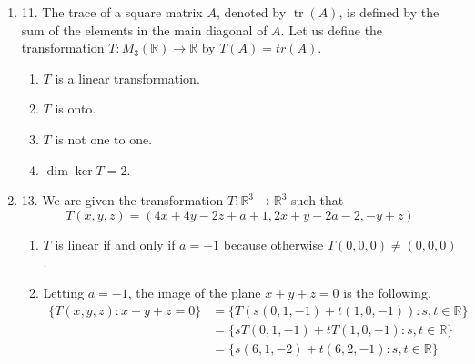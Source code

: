 \documentclass{article}
\newenvironment{answers}{ %
	\begin{enumerate}
		\setlength{\itemsep}{\bigskipamount}
}{\end{enumerate}}
\newcommand{\R}{\mathbb{R}}
\newcommand{\tr}{\operatorname{tr}}
\begin{document}
\begin{answers}
\begin{enumerate}
				For \(T\) to meet these constraints, the following must hold true.
				\begin{equation*}
					\forall s,t \in \R,\ T((2,2,1) + s(1,1,1) + t(1,4,0)) = (0,3,1)
				\end{equation*}
				By linearity of \(T\), we can then say the following.
				\begin{equation*}
					\forall s,t \in \R,\ T(2,2,1) + s + tT(1,4,0) = (0,3,1)
				\end{equation*}
				Yet this can only be true if \(T(1,1,1) = T(1,4,0) = (0,0,0)\) and \(T(2,2,1) = (0,3,1)\).

				Thus we have defined \(T\) on three vectors in \(\R^3\), and these form a basis over \(\R^3\), since there are as many of them as the dimension and they are independent. Hence we conclude that \(T\) is indeed unique.
		\end{enumerate}

	\item[11.]
		The trace of a square matrix \(A\), denoted by \(\tr(A)\), is defined by the sum of the elements in the main diagonal of \(A\). Let us define the transformation \(T : M_3(\R) \to \R\) by \(T(A) = tr(A)\).
		\begin{enumerate}
			\item \(T\) is a linear transformation.
			\item \(T\) is onto.
			\item \(T\) is not one to one.
			\item \(\dim \ker T = 2\).
		\end{enumerate}

	\item[13.]
		We are given the transformation \(T : \R^3 \to \R^3\) such that
		\begin{equation*}
			T(x,y,z) = (4x + 4y -2z + a + 1, 2x + y - 2a - 2, -y + z)
		\end{equation*}
		\begin{enumerate}
			\item
				\(T\) is linear if and only if \(a = -1\) because otherwise \(T(0,0,0) \neq (0,0,0)\).
			\item
				Letting \(a = -1\), the image of the plane \(x+y+z=0\) is the following.
				\begin{align*}
					\{T(x,y,z) : x + y + z = 0\} & = \{T(s(0,1,-1) + t(1,0,-1)) : s,t \in \R\} \\
					                             & = \{sT(0,1,-1) + tT(1,0,-1) : s,t \in \R\} \\
					                             & = \{s(6,1,-2) + t(6,2,-1) : s,t \in \R\}
				\end{align*}
		\end{enumerate}
\end{answers}
\end{document}
